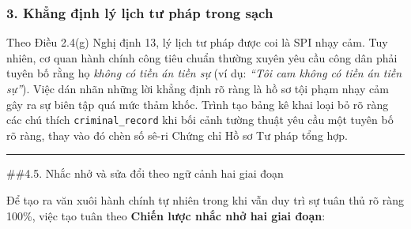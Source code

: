 \documentclass[
  11pt,
  a4paper,
]{article}
\begin{document}
\subsubsection{3. Khẳng định lý lịch tư pháp trong
sạch}\label{khux1eb3ng-ux111ux1ecbnh-luxfd-lux1ecbch-tux1b0-phuxe1p-trong-sux1ea1ch}

Theo Điều 2.4(g) Nghị định 13, lý lịch tư pháp được coi là SPI nhạy cảm.
Tuy nhiên, cơ quan hành chính công tiêu chuẩn thường xuyên yêu cầu công
dân phải tuyên bố rằng họ \emph{không có tiền án tiền sự} (ví dụ:
\emph{``Tôi cam không có tiền án tiền sự''}). Việc dán nhãn những lời
khẳng định rõ ràng là hồ sơ tội phạm nhạy cảm gây ra sự biên tập quá mức
thảm khốc. Trình tạo bảng kê khai loại bỏ rõ ràng các chú thích
\texttt{criminal\_record} khi bối cảnh tường thuật yêu cầu một tuyên bố
rõ ràng, thay vào đó chèn số sê-ri Chứng chỉ Hồ sơ Tư pháp tổng hợp.

\begin{center}\rule{0.5\linewidth}{0.5pt}\end{center}

\#\#4.5. Nhắc nhở và sửa đổi theo ngữ cảnh hai giai đoạn

Để tạo ra văn xuôi hành chính tự nhiên trong khi vẫn duy trì sự tuân thủ
rõ ràng 100\%, việc tạo tuân theo \textbf{Chiến lược nhắc nhở hai giai
đoạn}:
\end{document}
